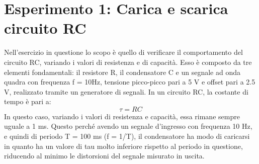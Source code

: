 \section{Esperimento 1: Carica e scarica circuito RC}

Nell’esercizio in questione lo scopo è quello di verificare il comportamento del circuito RC, variando i valori di resistenza e di capacità. Esso è composto da tre elementi fondamentali: il resistore R, il condensatore C e un segnale ad onda quadra con frequenza f = 10Hz, tensione picco-picco pari a 5 V e offset pari a 2.5 V, realizzato tramite un generatore di segnali. 
In un circuito RC, la costante di tempo è pari a: 
$$\tau = RC $$
In questo caso, variando i valori di resistenza e capacità, essa rimane sempre uguale a 1 ms. Questo perché avendo un segnale d’ingresso con frequenza 10 Hz, e quindi di periodo T = 100 ms (f = 1/T), il condensatore ha modo di caricarsi in quanto ha un valore di tau molto inferiore rispetto al periodo in questione, riducendo al minimo le distorsioni del segnale misurato in uscita.

\newpage


